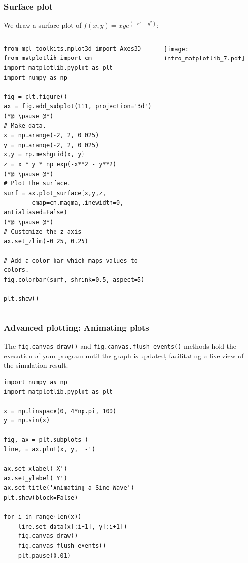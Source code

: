 \begin{frame}[fragile]
  \frametitle{Surface plot}
  We draw a surface plot of $\displaystyle f(x,y) = xy e^{\left(-x^2 -y^2 \right)}$:
  \begin{columns}
      \begin{lstlisting}[basicstyle=\tiny\ttfamily]
from mpl_toolkits.mplot3d import Axes3D
from matplotlib import cm
import matplotlib.pyplot as plt
import numpy as np

fig = plt.figure()
ax = fig.add_subplot(111, projection='3d')
(*@ \pause @*)
# Make data.
x = np.arange(-2, 2, 0.025)
y = np.arange(-2, 2, 0.025)
x,y = np.meshgrid(x, y)
z = x * y * np.exp(-x**2 - y**2)
(*@ \pause @*)
# Plot the surface.
surf = ax.plot_surface(x,y,z, 
        cmap=cm.magma,linewidth=0, antialiased=False)
(*@ \pause @*)
# Customize the z axis.
ax.set_zlim(-0.25, 0.25)

# Add a color bar which maps values to colors.
fig.colorbar(surf, shrink=0.5, aspect=5)

plt.show()
      \end{lstlisting}
      \texttt{[image: intro\_matplotlib\_7.pdf]}
  \end{columns}
\end{frame}


\begin{frame}[fragile]
  \frametitle{Advanced plotting: Animating plots}
  The \lstinline|fig.canvas.draw()| and \lstinline|fig.canvas.flush_events()| methods hold the execution of your program until the graph is updated, facilitating a live view of the simulation result.
  \begin{lstlisting}
import numpy as np
import matplotlib.pyplot as plt

x = np.linspace(0, 4*np.pi, 100)
y = np.sin(x)

fig, ax = plt.subplots()
line, = ax.plot(x, y, '-')

ax.set_xlabel('X')
ax.set_ylabel('Y')
ax.set_title('Animating a Sine Wave')
plt.show(block=False)

for i in range(len(x)):
    line.set_data(x[:i+1], y[:i+1])
    fig.canvas.draw()
    fig.canvas.flush_events()
    plt.pause(0.01)
  \end{lstlisting}
\end{frame}


